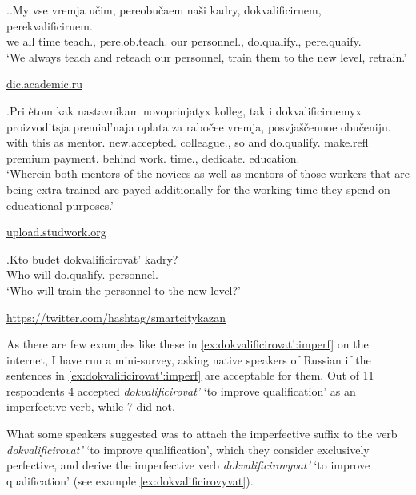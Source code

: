 \ex.\label{ex:dokvalificirovat':imperf}\ag.\label{ex:dokvalificirovat':ongoing}My vse vremja u\v{c}im, pereobu\v{c}aem na\v{s}i kadry, dokvalificiruem, perekvalificiruem.\\
we all time teach., pere.ob.teach. our personnel., do.qualify., pere.quaify.\\
\trans `We always teach and reteach our personnel, train them to the new level, retrain.' 
\begin{flushright}
\vspace{-0.5em}
\url{dic.academic.ru}
\end{flushright}
\bg.\label{ex:dokvalificirovat':part}Pri \`{e}tom kak nastavnikam novoprinjatyx kolleg, tak i dokvalificiruemyx proizvoditsja premial'naja oplata za rabo\v{c}ee vremja, posvja\v{s}\v{c}ennoe obu\v{c}eniju.\\
with this as mentor. new.accepted. colleague., so and do.qualify. make.refl premium payment. behind work. time., dedicate. education.\\
\trans `Wherein both mentors of the novices as well as mentors of those workers that are being extra-trained are payed additionally for the working time they spend on educational purposes.'
\begin{flushright}
\vspace{-0.5em}
\url{upload.studwork.org}
\end{flushright}
\bg.\label{ex:dokvalificirovat':future}Kto budet dokvalificirovat' kadry?\\
Who will do.qualify. personnel.\\
\trans `Who will train the personnel to the new level?'
\begin{flushright}
\vspace{-0.5em}
\url{https://twitter.com/hashtag/smartcitykazan}
\end{flushright}

As there are few examples like these in \ref{ex:dokvalificirovat':imperf} on the internet, I have run a mini-survey, asking native speakers of Russian if the sentences in \ref{ex:dokvalificirovat':imperf} are acceptable for them. Out of 11 respondents 4 accepted \textit{dokvalificirovat'} `to improve qualification' as an imperfective verb, while 7 did not.

What some speakers suggested was to attach the imperfective suffix to the verb \textit{dokvalificirovat'} `to improve qualification', which they consider exclusively perfective, and derive the imperfective verb \textit{dokvalificirovyvat'} `to improve qualification' (see example \ref{ex:dokvalificirovyvat}). 

